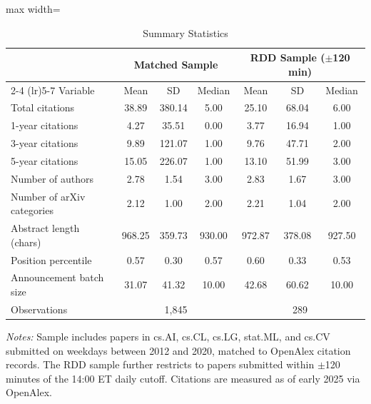 \begin{table}[htbp]
\centering
\caption{Summary Statistics}
\label{tab:summary}
\begin{adjustbox}{max width=\textwidth}
\begin{tabular}{lcccccc}
\hline\hline
& \multicolumn{3}{c}{Matched Sample} & \multicolumn{3}{c}{RDD Sample ($\pm$120 min)} \\
\cmidrule(lr){2-4} \cmidrule(lr){5-7}
Variable & Mean & SD & Median & Mean & SD & Median \\
\hline
Total citations & 38.89 & 380.14 & 5.00 & 25.10 & 68.04 & 6.00 \\
1-year citations & 4.27 & 35.51 & 0.00 & 3.77 & 16.94 & 1.00 \\
3-year citations & 9.89 & 121.07 & 1.00 & 9.76 & 47.71 & 2.00 \\
5-year citations & 15.05 & 226.07 & 1.00 & 13.10 & 51.99 & 3.00 \\
Number of authors & 2.78 & 1.54 & 3.00 & 2.83 & 1.67 & 3.00 \\
Number of arXiv categories & 2.12 & 1.00 & 2.00 & 2.21 & 1.04 & 2.00 \\
Abstract length (chars) & 968.25 & 359.73 & 930.00 & 972.87 & 378.08 & 927.50 \\
Position percentile & 0.57 & 0.30 & 0.57 & 0.60 & 0.33 & 0.53 \\
Announcement batch size & 31.07 & 41.32 & 10.00 & 42.68 & 60.62 & 10.00 \\
\hline
Observations & \multicolumn{3}{c}{1,845} & \multicolumn{3}{c}{289} \\
\hline\hline
\end{tabular}
\end{adjustbox}
\begin{minipage}{0.95\textwidth}
\footnotesize
\textit{Notes:} Sample includes papers in cs.AI, cs.CL, cs.LG, stat.ML, and cs.CV submitted on weekdays between 2012 and 2020, matched to OpenAlex citation records. The RDD sample further restricts to papers submitted within $\pm$120 minutes of the 14:00 ET daily cutoff. Citations are measured as of early 2025 via OpenAlex.
\end{minipage}
\end{table}
